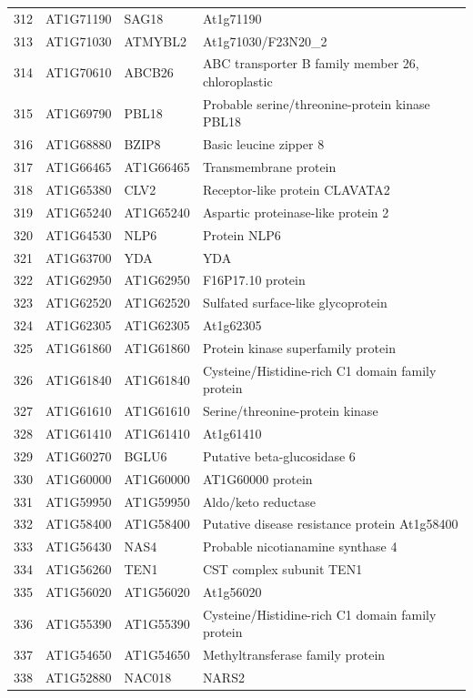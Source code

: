 \documentclass[11pt]{article}
\begin{document}
\begin{center}
\begin{tabular}{rlll}
312 & AT1G71190 & SAG18 & At1g71190\\
313 & AT1G71030 & ATMYBL2 & At1g71030/F23N20\_2\\
314 & AT1G70610 & ABCB26 & ABC transporter B family member 26, chloroplastic\\
315 & AT1G69790 & PBL18 & Probable serine/threonine-protein kinase PBL18\\
316 & AT1G68880 & BZIP8 & Basic leucine zipper 8\\
317 & AT1G66465 & AT1G66465 & Transmembrane protein\\
318 & AT1G65380 & CLV2 & Receptor-like protein CLAVATA2\\
319 & AT1G65240 & AT1G65240 & Aspartic proteinase-like protein 2\\
320 & AT1G64530 & NLP6 & Protein NLP6\\
321 & AT1G63700 & YDA & YDA\\
322 & AT1G62950 & AT1G62950 & F16P17.10 protein\\
323 & AT1G62520 & AT1G62520 & Sulfated surface-like glycoprotein\\
324 & AT1G62305 & AT1G62305 & At1g62305\\
325 & AT1G61860 & AT1G61860 & Protein kinase superfamily protein\\
326 & AT1G61840 & AT1G61840 & Cysteine/Histidine-rich C1 domain family protein\\
327 & AT1G61610 & AT1G61610 & Serine/threonine-protein kinase\\
328 & AT1G61410 & AT1G61410 & At1g61410\\
329 & AT1G60270 & BGLU6 & Putative beta-glucosidase 6\\
330 & AT1G60000 & AT1G60000 & AT1G60000 protein\\
331 & AT1G59950 & AT1G59950 & Aldo/keto reductase\\
332 & AT1G58400 & AT1G58400 & Putative disease resistance protein At1g58400\\
333 & AT1G56430 & NAS4 & Probable nicotianamine synthase 4\\
334 & AT1G56260 & TEN1 & CST complex subunit TEN1\\
335 & AT1G56020 & AT1G56020 & At1g56020\\
336 & AT1G55390 & AT1G55390 & Cysteine/Histidine-rich C1 domain family protein\\
337 & AT1G54650 & AT1G54650 & Methyltransferase family protein\\
338 & AT1G52880 & NAC018 & NARS2\\

\end{tabular}
\end{center}
\end{document}
